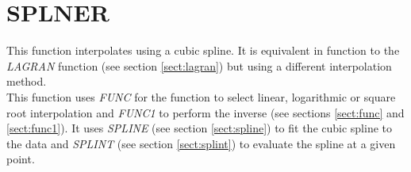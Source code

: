 \section{SPLNER}
\label{sect:splner}

\noindent This function interpolates using a cubic spline. It is equivalent
in function to the {\em LAGRAN} function (see section \ref{sect:lagran}) but
using a different interpolation method.\\

\noindent This function uses {\em FUNC} for the function to select linear,
logarithmic or square root interpolation and {\em FUNC1} to perform the
inverse (see sections \ref{sect:func} and \ref{sect:func1}). It uses {\em
SPLINE} (see section \ref{sect:spline}) to fit the cubic spline to the data
and {\em SPLINT} (see section \ref{sect:splint}) to evaluate the spline at a
given point.\\

